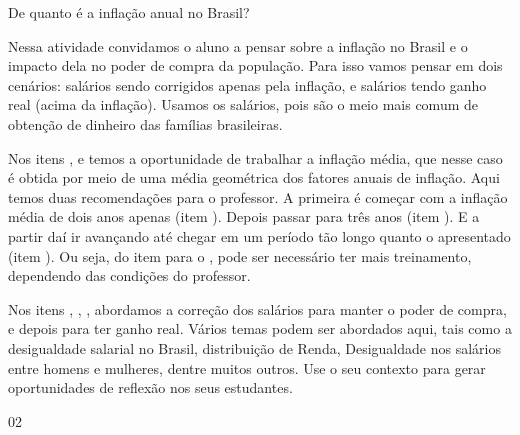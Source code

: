 \begin{sugestions}{De quanto é a inflação anual no Brasil?}
{
Nessa atividade convidamos o aluno a pensar sobre a inflação no Brasil e o impacto dela no poder de compra da população. Para isso vamos pensar em dois cenários: salários sendo corrigidos apenas pela inflação, e salários tendo ganho real (acima da inflação). Usamos os salários, pois são o meio mais comum de obtenção de dinheiro das famílias brasileiras.

Nos itens ,  e  temos a oportunidade de trabalhar a inflação média, que nesse caso é obtida por meio de uma média geométrica dos fatores anuais de inflação. Aqui temos duas recomendações para o professor. A primeira é começar com a inflação média de dois anos apenas (item ). Depois passar para três anos (item ). E a partir daí ir avançando até chegar em um período tão longo quanto o apresentado (item ). Ou seja, do item  para o , pode ser necessário ter mais treinamento, dependendo das condições do professor. 

Nos itens , , , abordamos a correção dos salários para manter o poder de compra, e depois para ter ganho real.  Vários temas podem ser abordados aqui, tais como a desigualdade salarial no Brasil, distribuição de Renda, Desigualdade nos salários entre homens e mulheres, dentre muitos outros. Use o seu contexto para gerar oportunidades de reflexão nos seus estudantes. 

}{0}{2}
\end{sugestions}

